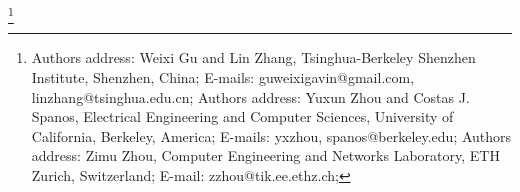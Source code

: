 \documentclass[acmlarge]{acmart}
\begin{document}
%
%
%


\thanks{
Authors address: Weixi Gu and Lin Zhang, Tsinghua-Berkeley Shenzhen Institute, Shenzhen, China;
E-mails: guweixigavin@gmail.com, linzhang@tsinghua.edu.cn;
Authors address: Yuxun Zhou and Costas J. Spanos, Electrical Engineering and Computer Sciences, University of California, Berkeley, America;
E-mails: {yxzhou, spanos}@berkeley.edu;
Authors address: Zimu Zhou, Computer Engineering and Networks Laboratory, ETH Zurich, Switzerland;
E-mail: zzhou@tik.ee.ethz.ch;
}

\maketitle




%



%




\end{document}
